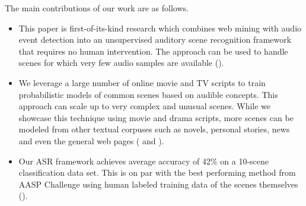 The main contributions of our work are as follows.
\begin{itemize}
\item This paper is first-of-its-kind research which combines web mining with
audio event detection into an unsupervised auditory scene recognition 
framework that requires no human intervention. The approach can be used to
handle scenes for which very few audio samples are available 
().
\item We leverage a large number of online movie and TV scripts to 
train probabilistic models of common scenes based on audible concepts.
This approach can scale up to very complex and unusual scenes. While
we showcase this technique using movie and drama scripts, more scenes
can be modeled from other textual corpuses such as novels, personal stories,
news and even the general web pages 
( and ).
\item Our ASR framework achieves average accuracy of 42\% on 
a 10-scene classification data set. 
This is on par with the best performing method from AASP Challenge 
using human labeled training data of the scenes themselves (). 
\end{itemize}




